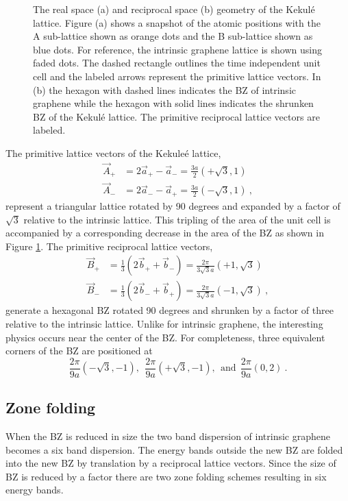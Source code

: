 \begin{figure}
	\begin{center}
	
	\end{center}
	\caption[The geometry of the Kekul\'e lattice]{\label{fig:kek:geometry}
		The real space (a) and reciprocal space (b) geometry of the Kekul\'e lattice.
		Figure (a) shows a snapshot of the atomic positions with the A sub-lattice shown as orange dots and the B sub-lattice shown as blue dots.	
		For reference, the intrinsic graphene lattice is shown using faded dots.
		The dashed rectangle outlines the time independent unit cell and the labeled arrows represent the primitive lattice vectors.
		In (b) the hexagon with dashed lines indicates the BZ of intrinsic graphene while the hexagon with solid lines indicates the shrunken BZ of the Kekul\'e lattice.
		The primitive reciprocal lattice vectors are labeled.
	}
\end{figure}

The primitive lattice vectors of the Kekule\'e lattice,
\begin{align*}
	\vec{A}_+&=2 \vec{a}_+-\vec{a}_-=\frac{3 a}{2} (+\sqrt{3},1) \\
	\vec{A}_-&=2 \vec{a}_--\vec{a}_+=\frac{3 a}{2} (-\sqrt{3},1) \ ,
\end{align*}
represent a triangular lattice rotated by 90 degrees and expanded by a factor of $\sqrt{3}$ relative to the intrinsic lattice.
This tripling of the area of the unit cell is accompanied by a corresponding decrease in the area of the BZ as shown in Figure \ref{fig:kek:geometry}.
The primitive reciprocal lattice vectors,
\begin{align*}
	\vec{B}_+&=\frac{1}{3} (2\vec{b}_+ + \vec{b}_-)=\frac{2 \pi}{3 \sqrt{3} a}(+1,\sqrt{3}) \\
	\vec{B}_-&=\frac{1}{3} (2\vec{b}_- + \vec{b}_+)=\frac{2 \pi}{3 \sqrt{3} a}(-1,\sqrt{3}) \ ,
\end{align*}
generate a hexagonal BZ rotated 90 degrees and shrunken by a factor of three relative to the intrinsic lattice.
Unlike for intrinsic graphene, the interesting physics occurs near the center of the BZ.
For completeness, three equivalent corners of the BZ are positioned at
\begin{equation*}
	\frac{2 \pi}{9 a} (-\sqrt{3},-1), \ \ \frac{2 \pi}{9 a} (+\sqrt{3},-1), \ \ \textrm{and} \ \  \frac{2 \pi}{9 a} (0,2) \ .
\end{equation*}

\subsection{Zone folding}
When the BZ is reduced in size the two band dispersion of intrinsic graphene becomes a six band dispersion.
The energy bands outside the new BZ are folded into the new BZ by translation by a reciprocal lattice vectors.
Since the size of BZ is reduced by a factor there are two zone folding schemes resulting in six energy bands.

